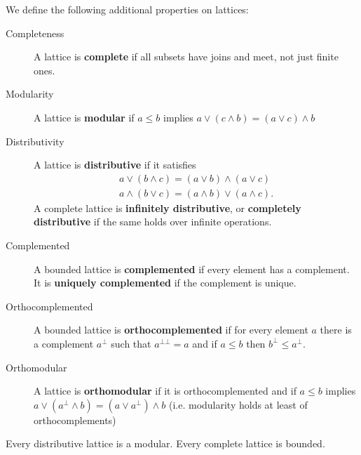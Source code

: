 \documentclass{bareminimum}
\begin{document}
\begin{defn}
	We define the following additional properties on lattices:
	\begin{description}
		\item[Completeness] A lattice is \textbf{complete} if all subsets have joins and meet, not just finite ones.
		\item[Modularity] A lattice is \textbf{modular} if $a \leq b$ implies $a \vee (c \wedge b) = (a \vee c) \wedge b$
		\item[Distributivity] A lattice is \textbf{distributive} if it satisfies
		\begin{align*}
			a \vee (b \wedge c) = (a \vee b) \wedge (a \vee c) \\
			a \wedge (b \vee c) = (a \wedge b) \vee (a \wedge c).
		\end{align*}
		A complete lattice is \textbf{infinitely distributive}, or \textbf{completely distributive} if the same holds over infinite operations.
		\item[Complemented] A bounded lattice is \textbf{complemented} if every element has a complement. It is \textbf{uniquely complemented} if the complement is unique.
		\item[Orthocomplemented] A bounded lattice is \textbf{orthocomplemented} if for every element $a$ there is a complement $a^{\bot}$ such that $a^{\bot\bot} = a$ and if $a \leq b$ then $b^{\bot} \leq a^{\bot}$.
		\item[Orthomodular] A lattice is \textbf{orthomodular} if it is orthocomplemented and if $a \leq b$ implies $a \vee (a^{\bot} \wedge b) = (a \vee a^{\bot}) \wedge b$ (i.e. modularity holds at least of orthocomplements)
	\end{description}
\end{defn}
\begin{prop}
	Every distributive lattice is a modular. Every complete lattice is bounded.
\end{prop}
\end{document}

